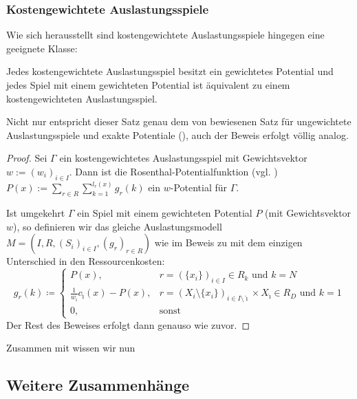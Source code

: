 \subsubsection{Kostengewichtete Auslastungsspiele}

Wie sich herausstellt sind kostengewichtete Auslastungsspiele hingegen eine geeignete Klasse:

\begin{satz}
	Jedes kostengewichtete Auslastungsspiel besitzt ein gewichtetes Potential und jedes Spiel mit einem gewichteten Potential ist äquivalent zu einem kostengewichteten Auslastungsspiel.
\end{satz}

Nicht nur entspricht dieser Satz genau dem von \citeauthor{MonShap} bewiesenen Satz für ungewichtete Auslastungsspiele und exakte Potentiale (), auch der Beweis erfolgt völlig analog. 

\begin{proof}
	Sei $\Gamma$ ein kostengewichtetes Auslastungsspiel mit Gewichtsvektor $w := (w_i)_{i\in I}$. Dann ist die Rosenthal-Potentialfunktion (vgl. \cite{RosenthalPotential}) $P(x) := \sum_{r \in R}\sum_{k=1}^{l_r(x)}g_r(k)$ ein $w$-Potential für $\Gamma$.
		
	Ist umgekehrt $\Gamma$ ein Spiel mit einem gewichteten Potential $P$ (mit Gewichtsvektor $w$), so definieren wir das gleiche Auslastungsmodell $M = (I, R, (S_i)_{i \in I}, (g_r)_{r \in R})$ wie im Beweis zu  mit dem einzigen Unterschied in den Ressourcenkosten:
		\[g_r(k) \coloneqq 
		\begin{cases}
		P(x), 									&r = \left(\{x_i\}\right)_{i \in I} \in R_k 													\text{ und } k=N \\
		\frac{1}{w_{\hat{\imath}}}c_{\hat{\imath}}(x) - P(x), 	&r = \left(X_i\setminus\{x_i\}\right)_{i \in I\setminus\hat{\imath}} \times X_{\hat{\imath}} \in R_D 	\text{ und } k=1 \\
		0,										&\text{sonst}
		\end{cases}\]
	Der Rest des Beweises erfolgt dann genauso wie zuvor.
\end{proof}

Zusammen mit  wissen wir nun 


\subsection{Weitere Zusammenhänge}

